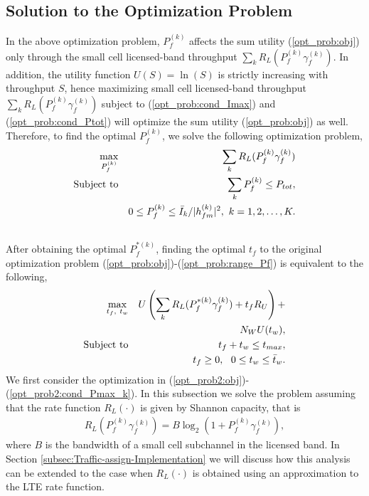 \documentclass[journal,final,letterpaper,10pt,doublecolumn,twoside]{IEEEtran}
\begin{document}
\subsection{Solution to the Optimization Problem} \label{sec:opt_solution}
In the above optimization problem, $P_f^{(k)}$ affects the sum
utility (\ref{opt_prob:obj}) only through the  small cell
licensed-band throughput  $\sum_k R_L(P_f^{(k)} \gamma_f^{(k)})$. In
addition,  the utility function $U(S)=\ln(S)$ is strictly increasing
with throughput $S$, hence maximizing  small cell  licensed-band
throughput $\sum_k R_L(P_f^{(k)} \gamma_f^{(k)})$  subject to
(\ref{opt_prob:cond_Imax}) and (\ref{opt_prob:cond_Ptot}) will
optimize the sum utility (\ref{opt_prob:obj}) as well. Therefore, to
find the optimal $P_f^{(k)}$, we solve the following optimization
problem,
\begin{eqnarray}
\max_{P_f^{(k)}} && \sum_k R_L(P_f^{(k)} \gamma_f^{(k)}) \label{opt_prob2:obj} \\
\textmd{Subject to} && \sum_{k} P_f^{(k)} \leq P_{tot} , \label{opt_prob2:cond_Ptot} \\
&& 0 \leq P_f^{(k)}  \leq \bar{I}_k / |h_{fm}^{(k)}|^2 , ~ k = 1, 2, \dots, K . \nonumber \\
&&  \label{opt_prob2:cond_Pmax_k}
\end{eqnarray}
After obtaining the optimal $P_f^{*(k)}$, finding the optimal $t_f$ to the original optimization problem (\ref{opt_prob:obj})-(\ref{opt_prob:range_Pf}) is equivalent to the following,
\begin{eqnarray}
\max_{t_f, ~t_w} && U \left ( \sum_k R_L(P_f^{*(k)} \gamma_f^{(k)}) + t_f R_U \right  )  + \nonumber \\
&& N_W U( t_w ) , \label{opt_prob3:obj} \\
\textmd{Subject to}
&& t_f + t_w \leq  t_{max} , \label{opt_prob3:tmax} \\
&& t_f \geq 0, ~~ 0 \leq t_w \leq \bar{t}_w  . \label{opt_prob3:range_tf}
\end{eqnarray}
We first consider the optimization in (\ref{opt_prob2:obj})-(\ref{opt_prob2:cond_Pmax_k}).  In this subsection we solve the problem assuming that the rate function $R_L(\cdot)$ is given by Shannon capacity, that is
\begin{eqnarray}
R_L(P_f^{(k)} \gamma_f^{(k)}) = B \log_2(1+P_f^{(k)} \gamma_f^{(k)}), \label{eq:ratefunction}
\end{eqnarray}
where $B$ is the bandwidth of a small cell subchannel in the licensed band.
In Section \ref{subsec:Traffic-assign-Implementation} we will discuss how this analysis can be extended to the case when $R_L(\cdot)$  is obtained using an approximation to the LTE rate function.
\end{document}
